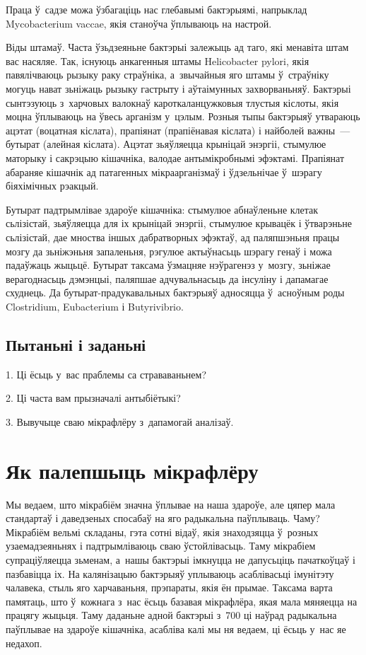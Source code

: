 Праца ў~садзе можа ўзбагаціць нас глебавымі бактэрыямі, напрыклад Mycobacterium vaccae, якія станоўча ўплываюць на настрой.

Віды штамаў. Часта ўзьдзеяньне бактэрыі залежыць ад таго, які менавіта штам вас насяляе. Так, існуюць анкагенныя штамы Helicobacter pylori, якія павялічваюць рызыку раку страўніка, а~звычайныя яго штамы ў~страўніку могуць нават зьніжаць рызыку гастрыту і аўтаімунных захворваньняў. Бактэрыі сынтэзуюць з~харчовых валокнаў кароткаланцужковыя тлустыя кіслоты, якія моцна ўплываюць на ўвесь арганізм у~цэлым. Розныя тыпы бактэрыяў утвараюць ацэтат (воцатная кіслата), прапіянат (прапіёнавая кіслата) і найболей важны~--- бутырат (алейная кіслата). Ацэтат зьяўляецца крыніцай энэргіі, стымулюе маторыку і сакрэцыю кішачніка, валодае антымікробнымі эфэктамі. Прапіянат абараняе кішачнік ад патагенных мікраарганізмаў і ўдзельнічае ў~шэрагу біяхімічных рэакцый.

Бутырат падтрымлівае здароўе кішачніка: стымулюе абнаўленьне клетак сьлізістай, зьяўляецца для іх крыніцай энэргіі, стымулюе крывацёк і ўтварэньне сьлізістай, дае мноства іншых дабратворных эфэктаў, ад паляпшэньня працы мозгу да зьніжэньня запаленьня, рэгулюе актыўнасьць шэрагу генаў і можа падаўжаць жыцьцё. Бутырат таксама ўзмацняе нэўрагенэз у~мозгу, зьніжае верагоднасьць дэмэнцыі, паляпшае адчувальнасьць да інсуліну і дапамагае схуднець. Да бутырат-прадукавальных бактэрыяў адносяцца ў~асноўным роды Clostridium, Eubacterium і Butyrivibrio.

\subsection*{Пытаньні і заданьні}

1. Ці ёсьць у~вас праблемы са страваваньнем?

2. Ці часта вам прызначалі антыбіётыкі?

3. Вывучыце сваю мікрафлёру з~дапамогай аналізаў.


\section{Як палепшыць мікрафлёру}

Мы ведаем, што мікрабіём значна ўплывае на наша здароўе, але цяпер мала стандартаў і даведзеных спосабаў на яго радыкальна паўплываць. Чаму? Мікрабіём вельмі складаны, гэта сотні відаў, якія знаходзяцца ў~розных узаемадзеяньнях і падтрымліваюць сваю ўстойлівасьць. Таму мікрабіем супраціўляецца зьменам, а~нашы бактэрыі імкнуцца не дапусьціць пачаткоўцаў і пазбавіцца іх. На калянізацыю бактэрыяў уплываюць асаблівасьці імунітэту чалавека, стыль яго харчаваньня, прэпараты, якія ён прымае. Таксама варта памятаць, што ў~кожнага з~нас ёсьць базавая мікрафлёра, якая мала мяняецца на працягу жыцьця. Таму даданьне адной бактэрыі з~700 ці наўрад радыкальна паўплывае на здароўе кішачніка, асабліва калі мы ня ведаем, ці ёсьць у~нас яе недахоп.

